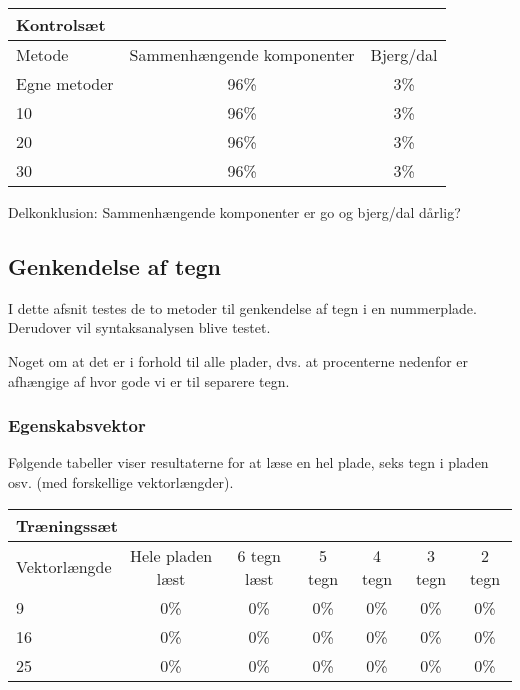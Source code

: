 \begin{tabular}{|l|c|c|}\hline
\multicolumn{3}{|l|}{Kontrolsæt} \\\hline
Metode & Sammenhængende komponenter & Bjerg/dal \\\hline
Egne metoder & 96\% & 3\% \\\hline
10 & 96\% & 3\% \\\hline
20 & 96\% & 3\% \\\hline
30 & 96\% & 3\% \\\hline \end{tabular}

Delkonklusion:
Sammenhængende komponenter er go og bjerg/dal dårlig?


\subsection{Genkendelse af tegn}
I dette afsnit testes de to metoder til genkendelse af tegn i en nummerplade. Derudover vil syntaksanalysen blive testet.

Noget om at det er i forhold til alle plader, dvs. at procenterne nedenfor er afhængige af hvor gode vi er til separere tegn.

\subsubsection{Egenskabsvektor}


Følgende tabeller viser resultaterne for at læse en hel plade, seks tegn i pladen osv. (med forskellige vektorlængder).

\begin{tabular}{|l|c|c|c|c|c|c|}\hline
\multicolumn{7}{|l|}{Træningssæt} \\\hline
Vektorlængde & Hele pladen læst & 6 tegn læst & 5 tegn & 4 tegn & 3 tegn & 2 tegn \\\hline
9 & 0\% & 0\% & 0\% & 0\% & 0\% & 0\% \\\hline
16 & 0\% & 0\% & 0\% & 0\% & 0\% & 0\% \\\hline
25 & 0\% & 0\% & 0\% & 0\% & 0\% & 0\% \\\hline \end{tabular}

